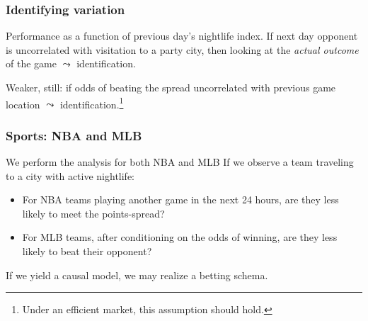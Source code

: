 \documentclass{beamer}
\begin{document}
\begin{frame}   \frametitle{Identifying variation}
  \begin{block}{Performance as a function of previous day's nightlife index.}     If next day opponent is uncorrelated with visitation to a party city,
    then looking at the \emph{actual outcome} of the game $\leadsto$ identification.

    \vspace{15pt} 

    Weaker, still: if odds of beating the spread uncorrelated with previous game location
    $\leadsto$ identification.\footnote{Under an efficient market, this assumption should hold.}       \end{block}
\end{frame}


  


\begin{frame}   \frametitle{Sports: NBA and MLB}
  \begin{block}{We perform the analysis for both NBA and MLB}     
    If we observe a team traveling to a city with active nightlife:
    \vspace{12pt}
    \begin{itemize}       \item For NBA teams playing another game in the next 24 hours, are they less likely to meet the points-spread?
      \item For MLB teams, after conditioning on the odds of winning, are they less likely to beat their opponent?     \end{itemize}
    \vspace{12pt}\begin{block}{If we yield a causal model, we may realize a betting schema.}     
\end{block}
  \end{block} 
\end{frame}
\end{document}
